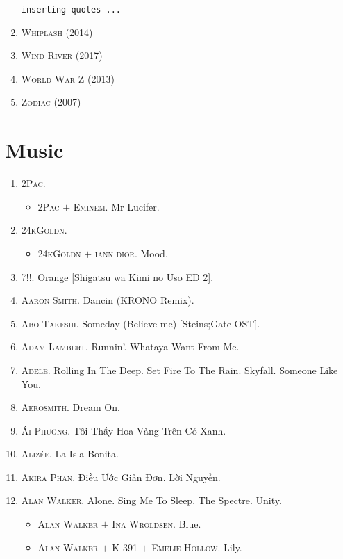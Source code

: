 \documentclass[oneside]{book}
\numberwithin{equation}{section}
\begin{document}
\begin{enumerate}
	\texttt{inserting quotes ...}
	\item \textsc{Whiplash} (2014)
	\item \textsc{Wind River} (2017)
	\item \textsc{World War Z} (2013)
	\item \textsc{Zodiac} (2007)
\end{enumerate}


\chapter{Music}

\begin{enumerate}
	\item \textsc{2Pac.}
	\begin{itemize}
		\item \textsc{2Pac $+$ Eminem.} Mr Lucifer.
	\end{itemize}
	\item \textsc{24kGoldn.}
	\begin{itemize}
		\item \textsc{24kGoldn $+$ iann dior.} Mood.
	\end{itemize}
	\item \textsc{7!!.} Orange [Shigatsu wa Kimi no Uso ED 2].
	\item \textsc{Aaron Smith.} Dancin (KRONO Remix).
	\item \textsc{Abo Takeshi.} Someday (Believe me) [Steins;Gate OST].
	\item \textsc{Adam Lambert.} Runnin'. Whataya Want From Me.
	\item \textsc{Adele.} Rolling In The Deep. Set Fire To The Rain. Skyfall. Someone Like You.
	\item \textsc{Aerosmith.} Dream On.
	\item \textsc{Ái Phương.} Tôi Thấy Hoa Vàng Trên Cỏ Xanh.
	\item \textsc{Alizée.} La Isla Bonita.
	\item \textsc{Akira Phan.} Điều Ước Giản Đơn. Lời Nguyền.
	\item \textsc{Alan Walker.} Alone. Sing Me To Sleep. The Spectre. Unity.
	\begin{itemize}
		\item \textsc{Alan Walker $+$ Ina Wroldsen.} Blue.
		\item \textsc{Alan Walker $+$ K-391 $+$ Emelie Hollow.} Lily.

\end{itemize}
\end{enumerate}
\end{document}
